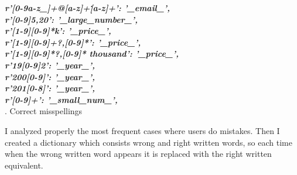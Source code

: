 \noindent
\textit{\textbf{r'[0-9a-z\_]+@[a-z]+\.[a-z]+': '\_email\_', \\
r'[0-9]{5,20}': '\_large\_number\_',\\
r'[1-9][0-9]*k': '\_price\_',
\\
r'[1-9][0-9]+?,[0-9]*': '\_price\_',
\\
r'[1-9][0-9]*?,[0-9]* thousand': '\_price\_',
\\
r'19[0-9]{2}': '\_year\_',
\\
r'200[0-9]': '\_year\_',
\\
r'201[0-8]': '\_year\_',
\\
r'[0-9]+': '\_small\_num\_',}}
\\

. Correct misspellings

I analyzed properly the most frequent cases where users do mistakes. Then I created a dictionary which consists wrong and right written words, so each time when the wrong written word appears it is replaced with the right written equivalent. 

\newcolumntype{b}{X}

